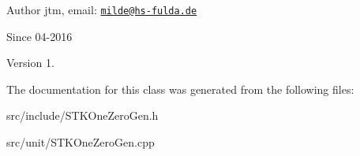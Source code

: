 \begin{DoxyAuthor}{Author}
jtm, email\-:  \href{mailto:milde@hs-fulda.de}{\tt milde@hs-\/fulda.\-de} 
\end{DoxyAuthor}
\begin{DoxySince}{Since}
04-\/2016 
\end{DoxySince}
\begin{DoxyVersion}{Version}
1. 
\end{DoxyVersion}


The documentation for this class was generated from the following files\-:\begin{DoxyCompactItemize}
\item 
src/include/S\-T\-K\-One\-Zero\-Gen.\-h\item 
src/unit/S\-T\-K\-One\-Zero\-Gen.\-cpp\end{DoxyCompactItemize}
